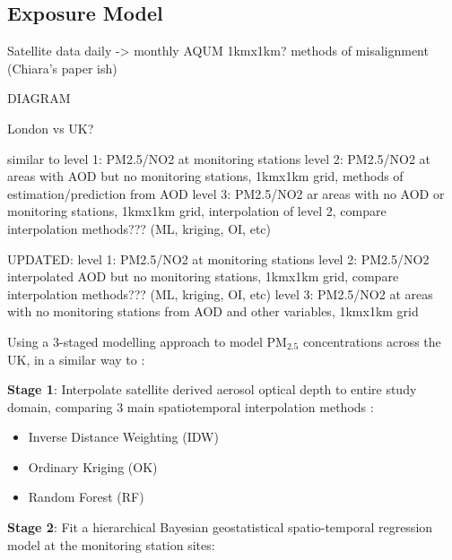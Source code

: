 
\subsection{Exposure Model}
Satellite data daily -> monthly
AQUM 1kmx1km? methods of misalignment (Chiara's paper ish)


DIAGRAM


London vs UK?

similar to \cite{deHoogh2018ModellingSwitzerland}
level 1: PM2.5/NO2 at monitoring stations 
level 2: PM2.5/NO2 at areas with AOD but no monitoring stations, 1kmx1km grid, methods of estimation/prediction from AOD
level 3: PM2.5/NO2 ar areas with no AOD or monitoring stations, 1kmx1km grid, interpolation of level 2, compare interpolation methods??? (ML, kriging, OI, etc)

UPDATED:
level 1: PM2.5/NO2 at monitoring stations 
level 2: PM2.5/NO2 interpolated AOD but no monitoring stations, 1kmx1km grid, compare interpolation methods??? (ML, kriging, OI, etc)
level 3: PM2.5/NO2 at areas with no monitoring stations from AOD and other variables, 1kmx1km grid


Using a 3-staged modelling approach to model PM$_{2.5}$ concentrations across the UK, in a similar way to \cite{Kloog2014AData}:

\textbf{Stage 1}: Interpolate satellite derived aerosol optical depth to entire study domain, comparing 3 main spatiotemporal interpolation methods \citep{Susanto2016SpatiotemporalModelling}:
\begin{itemize}
    \item Inverse Distance Weighting (IDW)
    \item Ordinary Kriging (OK)
    \item Random Forest (RF)
\end{itemize}

\textbf{Stage 2}: 
Fit a hierarchical Bayesian geostatistical spatio-temporal regression model at the monitoring station sites:
\cite[p.459-461]{Gelfand2019HandbookStatistics}

